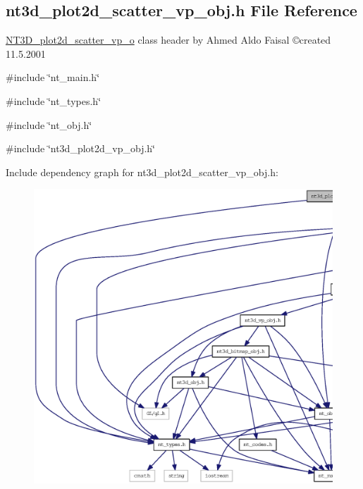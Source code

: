 \subsection{nt3d\_\-plot2d\_\-scatter\_\-vp\_\-obj.h File Reference}
\label{nt3d__plot2d__scatter__vp__obj_8h}



\begin{DoxyItemize}
\item \hyperlink{class_n_t3_d__plot2d__scatter__vp__o}{NT3D\_\-plot2d\_\-scatter\_\-vp\_\-o} class header by Ahmed Aldo Faisal \copyright created 11.5.2001 
\end{DoxyItemize} 


{\ttfamily \#include \char`\"{}nt\_\-main.h\char`\"{}}\par
{\ttfamily \#include \char`\"{}nt\_\-types.h\char`\"{}}\par
{\ttfamily \#include \char`\"{}nt\_\-obj.h\char`\"{}}\par
{\ttfamily \#include \char`\"{}nt3d\_\-plot2d\_\-vp\_\-obj.h\char`\"{}}\par
Include dependency graph for nt3d\_\-plot2d\_\-scatter\_\-vp\_\-obj.h:
\nopagebreak
\begin{figure}[H]
\begin{center}
\leavevmode
\includegraphics[width=400pt]{nt3d__plot2d__scatter__vp__obj_8h__incl}
\end{center}
\end{figure}
